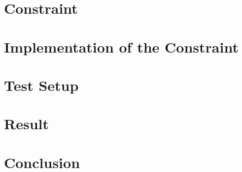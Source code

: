 \chapter{Constraint}

\chapter{Implementation of the Constraint}


\chapter{Test Setup}

\chapter{Result}



\chapter{Conclusion}



